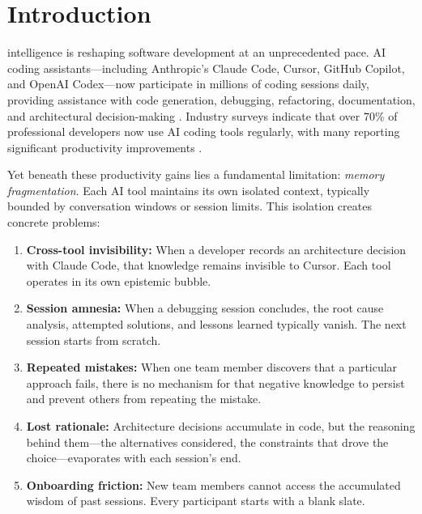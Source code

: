 \documentclass[10pt,journal,compsoc]{IEEEtran}
\begin{document}
\IEEEdisplaynontitleabstractindextext
\IEEEpeerreviewmaketitle

\section{Introduction}
 intelligence is reshaping software development at an unprecedented pace. AI coding assistants---including Anthropic's Claude Code, Cursor, GitHub Copilot, and OpenAI Codex---now participate in millions of coding sessions daily, providing assistance with code generation, debugging, refactoring, documentation, and architectural decision-making \cite{vaithilingam2022expectation,barke2023grounded}. Industry surveys indicate that over 70\% of professional developers now use AI coding tools regularly, with many reporting significant productivity improvements \cite{github2023survey}.

Yet beneath these productivity gains lies a fundamental limitation: \emph{memory fragmentation}. Each AI tool maintains its own isolated context, typically bounded by conversation windows or session limits. This isolation creates concrete problems:

\begin{enumerate}
\item \textbf{Cross-tool invisibility:} When a developer records an architecture decision with Claude Code, that knowledge remains invisible to Cursor. Each tool operates in its own epistemic bubble.

\item \textbf{Session amnesia:} When a debugging session concludes, the root cause analysis, attempted solutions, and lessons learned typically vanish. The next session starts from scratch.

\item \textbf{Repeated mistakes:} When one team member discovers that a particular approach fails, there is no mechanism for that negative knowledge to persist and prevent others from repeating the mistake.

\item \textbf{Lost rationale:} Architecture decisions accumulate in code, but the reasoning behind them---the alternatives considered, the constraints that drove the choice---evaporates with each session's end.

\item \textbf{Onboarding friction:} New team members cannot access the accumulated wisdom of past sessions. Every participant starts with a blank slate.
\end{enumerate}
\end{document}
